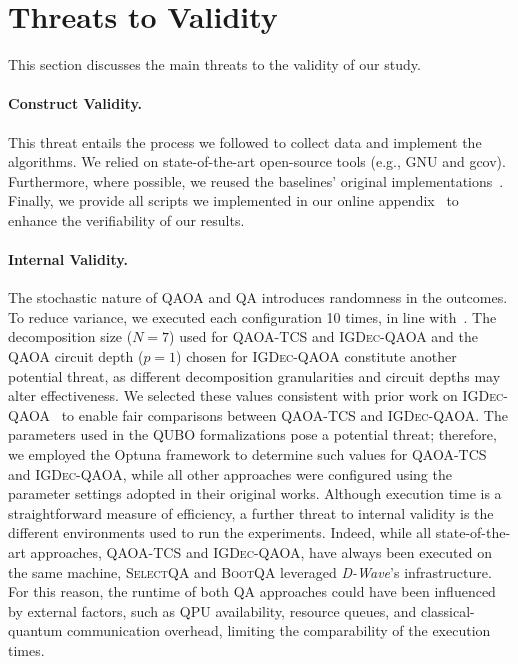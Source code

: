 
\section{Threats to Validity}
\label{sec:5}
This section discusses the main threats to the validity of our study. 

\paragraph{Construct Validity.}
This threat entails the process we followed to collect data and implement the algorithms. We relied on state-of-the-art open-source tools (e.g., GNU and gcov). Furthermore, where possible, we reused the baselines' original implementations~\citep{selectqa,panichella2014improving,bootqa,igdec_qaoa}. Finally, we provide all scripts we implemented in our online appendix~\citep{appendix} to enhance the verifiability of our results.

\paragraph{Internal Validity.}  
The stochastic nature of QAOA and QA introduces randomness in the outcomes. To reduce variance, we executed each configuration 10 times, in line with~\citet{selectqa,bootqa}.
The decomposition size ($N=7$) used for \textsc{QAOA-TCS} and \textsc{IGDec-QAOA} and the QAOA circuit depth ($p=1$) chosen for \textsc{IGDec-QAOA} constitute another potential threat, as different decomposition granularities and circuit depths may alter effectiveness. We selected these values consistent with prior work on \textsc{IGDec-QAOA}~\citep{igdec_qaoa} to enable fair comparisons between \textsc{QAOA-TCS} and \textsc{IGDec-QAOA}.
The parameters used in the QUBO formalizations pose a potential threat; therefore, we employed the Optuna framework to determine such values for \textsc{QAOA-TCS} and \textsc{IGDec-QAOA}, while all other approaches were configured using the parameter settings adopted in their original works.
Although execution time is a straightforward measure of efficiency, a further threat to internal validity is the different environments used to run the experiments. Indeed, while all state-of-the-art approaches, \textsc{QAOA-TCS} and \textsc{IGDec-QAOA}, have always been executed on the same machine, \textsc{SelectQA} and \textsc{BootQA} leveraged \textit{D-Wave}'s infrastructure. For this reason, the runtime of both QA approaches could have been influenced by external factors, such as QPU availability, resource queues, and classical-quantum communication overhead, limiting the comparability of the execution times.

